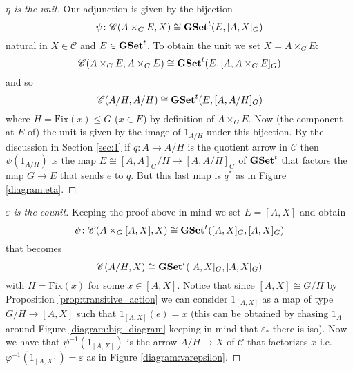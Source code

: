 \documentclass[italian, 12pt, reqno]{article}
\theoremstyle{myteo}
\numberwithin{equation}{section}
\newcommand{\cat}[1]{\mathscr{#1}}
\newcommand{\tgset}{\text{\textbf{GSet}}^t}
\newcommand{\homs}[2]{[#1, #2]}
\newcommand{\fun}[3]{#1\colon#2\to #3}
\begin{document}
\begin{proof}[\(\eta\) is the unit]
  Our adjunction is given by the bijection
  \[\psi\colon\cat{C}(A\times_G E, X)\cong\tgset(E, \homs{A}{X}_G)\]
  natural in \(X\in\cat{C}\) and \(E\in\tgset\).
  To obtain the unit we set \(X = A\times_G E\):
  \[\cat{C}(A\times_G E, A\times_G E)\cong\tgset(E, \homs{A}{A\times_G E}_G)\]
  and so
  \[\cat{C}(A/H, A/H)\cong\tgset(E, \homs{A}{A/H}_G)\]
  where \(H = \text{Fix}(x)\leq G\) (\(x\in E\)) by definition of \(A\times_G E\).
  Now (the component at \(E\) of) the unit is given by the image of \(1_{A/H}\) under this bijection.
  By the discussion in Section \ref{sec:1} if \(\fun{q}{A}{A/H}\) is the quotient arrow in \(\cat{C}\) then \(\psi(1_{A/H})\) is the map \(E\cong\homs{A}{A}_G/H \to \homs{A}{A/H}_G\) of \(\tgset\) that factors the map \(G\to E\) that sends \(e\) to \(q\).
  But this last map is \(q^*\) as in Figure \ref{diagram:eta}.
\end{proof}

\begin{proof}[\(\varepsilon\) is the counit]
  Keeping the proof above in mind we set \(E = \homs{A}{X}\) and obtain
  \[\psi\colon \cat{C}(A\times_G\homs{A}{X}, X) \cong \tgset(\homs{A}{X}_G, \homs{A}{X}_G)\]
  that becomes
  \[\cat{C}(A/H, X) \cong \tgset(\homs{A}{X}_G, \homs{A}{X}_G)\]
  with \(H = \text{Fix}(x)\) for some \(x\in\homs{A}{X}\).
  Notice that since \(\homs{A}{X}\cong G/H\) by Proposition \ref{prop:transitive_action} we can consider \(1_{\homs{A}{X}}\) as a map of type \(G/H \to \homs{A}{X}\) such that \(1_{\homs{A}{X}}(e) = x\) (this can be obtained by chasing \(1_A\) around Figure \ref{diagram:big_diagram} keeping in mind that \(\varepsilon_*\) there is iso).
  Now we have that \(\psi^{-1}(1_{\homs{A}{X}})\) is the arrow \(A/H\to X\) of \(\cat{C}\) that factorizes \(x\) i.e. \(\varphi^{-1}(1_{\homs{A}{X}}) = \varepsilon\) as in Figure \ref{diagram:varepsilon}.
\end{proof}
\end{document}
